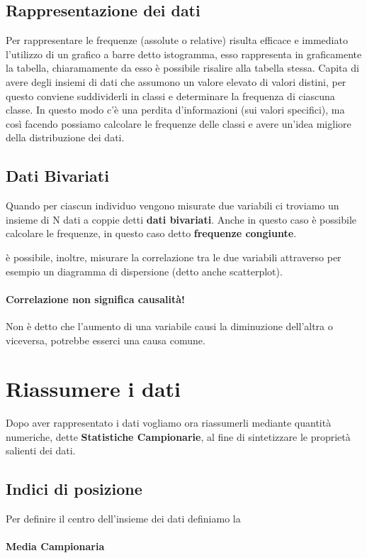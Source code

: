 \documentclass[12pt, a4paper, openany]{book}
\begin{document}
\subsection{Rappresentazione dei dati}
Per rappresentare le frequenze (assolute o relative) risulta efficace e immediato l'utilizzo di un grafico a barre detto istogramma,
esso rappresenta in graficamente la tabella, chiaramamente da esso è possibile risalire alla tabella stessa.
Capita di avere degli insiemi di dati che assumono un valore elevato di valori distini, per questo conviene suddividerli in classi e
determinare la frequenza di ciascuna classe. In questo modo c'è una perdita d'informazioni (sui valori specifici), ma così facendo possiamo
calcolare le frequenze delle classi e avere un'idea migliore della distribuzione dei dati.

\subsection{Dati Bivariati}
Quando per ciascun individuo vengono misurate due variabili ci troviamo un insieme di N dati a coppie detti \textbf{dati bivariati}.
Anche in questo caso è possibile calcolare le frequenze, in questo caso detto \textbf{frequenze congiunte}.

è possibile, inoltre, misurare la correlazione tra le due variabili attraverso per esempio un diagramma di dispersione (detto anche scatterplot).

\paragraph{Correlazione non significa causalità!} Non è detto che l'aumento di una variabile causi la diminuzione dell'altra o viceversa, potrebbe esserci una causa comune. 

\section{Riassumere i dati}
Dopo aver rappresentato i dati vogliamo ora riassumerli mediante quantità numeriche, dette \textbf{Statistiche Campionarie}, al fine di sintetizzare le proprietà
salienti dei dati.

\subsection{Indici di posizione}
Per definire il centro dell'insieme dei dati definiamo la 
\paragraph{\textbf{Media Campionaria}}  %
\end{document}
